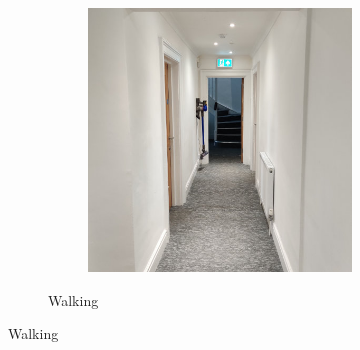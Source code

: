 \begin{figure}[!hbtp]
\begin{subfigure}[b]{\textwidth}
\begin{subfigure}[b]{0.32\textwidth}
        \end{subfigure}
        \hfill
        \begin{subfigure}[b]{0.32\textwidth}
             \centering
             \includegraphics[width=\textwidth]{content/3-Methods/enviroments/flat_3_modified.jpg}
        \end{subfigure}
        \caption{Walking}
        \label{fig:methods-flat-example}
      \end{subfigure}
      \newline
      

\end{figure}
